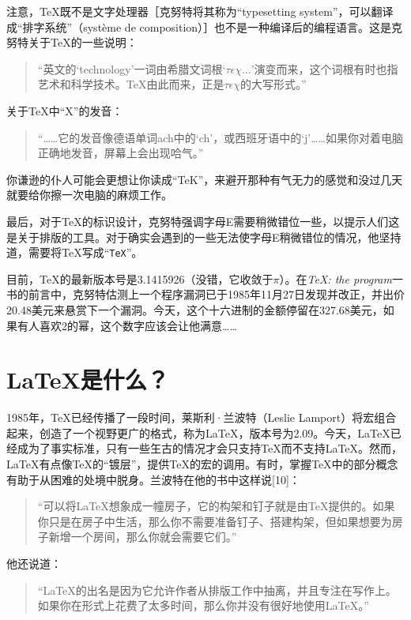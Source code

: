 注意，\TeX 既不是文字处理器［克努特将其称为“typesetting system”，可以翻译成“排字系统”（système de composition）］也不是一种编译后的编程语言。这是克努特关于\TeX 的一些说明：

\begin{quote}
    “英文的‘technology’一词由希腊文词根‘$ \tau\epsilon\chi...$’演变而来，这个词根有时也指艺术和科学技术。\TeX 由此而来，正是$ \tau\epsilon\chi$的大写形式。”
\end{quote}

关于\TeX 中“X”的发音：

\begin{quote}
    “……它的发音像德语单词ach中的‘ch’，或西班牙语中的‘j’……如果你对着电脑正确地发音，屏幕上会出现哈气。”
\end{quote}

你谦逊的仆人可能会更想让你读成“TeK”，来避开那种有气无力的感觉和没过几天就要给你擦一次电脑的麻烦工作。

最后，对于\TeX 的标识设计，克努特强调字母E需要稍微错位一些，以提示人们这是关于排版的工具。对于确实会遇到的一些无法使字母E稍微错位的情况，他坚持道，需要将\TeX 写成“\texttt{TeX}”。

目前，\TeX 的最新版本号是3.1415926（没错，它收敛于$\pi$）。在\textit{\TeX : the program}一书的前言中，克努特估测上一个程序漏洞已于1985年11月27日发现并改正，并出价20.48美元来悬赏下一个漏洞。今天，这个十六进制的金额停留在327.68美元，如果有人喜欢2的幂，这个数字应该会让他满意……

\section*{\LaTeX 是什么？}

1985年，\TeX 已经传播了一段时间，莱斯利·兰波特（Leslie Lamport）将宏组合起来，创造了一个视野更广的格式，称为\LaTeX ，版本号为2.09。今天，\LaTeX 已经成为了事实标准，只有一些玍古的情况才会只支持\TeX 而不支持\LaTeX 。然而，\LaTeX 有点像\TeX 的“镀层”，提供\TeX 的宏的调用。有时，掌握\TeX 中的部分概念有助于从困难的处境中脱身。兰波特在他的书中这样说[10]：%

\begin{quote}
    “可以将\LaTeX 想象成一幢房子，它的构架和钉子就是由\TeX 提供的。如果你只是在房子中生活，那么你不需要准备钉子、搭建构架，但如果想要为房子新增一个房间，那么你就会需要它们。”
\end{quote}

他还说道：

\begin{quote}
    “\LaTeX 的出名是因为它允许作者从排版工作中抽离，并且专注在写作上。如果你在形式上花费了太多时间，那么你并没有很好地使用\LaTeX 。”
\end{quote}

